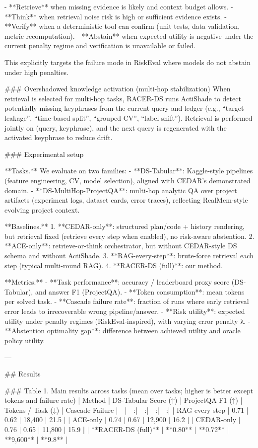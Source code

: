 - **Retrieve** when missing evidence is likely and context budget allows.
- **Think** when retrieval noise risk is high or sufficient evidence exists.
- **Verify** when a deterministic tool can confirm (unit tests, data validation, metric recomputation).
- **Abstain** when expected utility is negative under the current penalty regime and verification is unavailable or failed.

This explicitly targets the failure mode in RiskEval where models do not abstain under high penalties.

### Overshadowed knowledge activation (multi-hop stabilization)  
When retrieval is selected for multi-hop tasks, RACER-DS runs ActiShade to detect potentially missing keyphrases from the current query and ledger (e.g., “target leakage”, “time-based split”, “grouped CV”, “label shift”). Retrieval is performed jointly on (query, keyphrase), and the next query is regenerated with the activated keyphrase to reduce drift.

### Experimental setup  

**Tasks.** We evaluate on two families:
- **DS-Tabular**: Kaggle-style pipelines (feature engineering, CV, model selection), aligned with CEDAR’s demonstrated domain.
- **DS-MultiHop-ProjectQA**: multi-hop analytic QA over project artifacts (experiment logs, dataset cards, error traces), reflecting RealMem-style evolving project context.

**Baselines.**
1. **CEDAR-only**: structured plan/code + history rendering, but retrieval fixed (retrieve every step when enabled), no risk-aware abstention.
2. **ACE-only**: retrieve-or-think orchestrator, but without CEDAR-style DS schema and without ActiShade.
3. **RAG-every-step**: brute-force retrieval each step (typical multi-round RAG).
4. **RACER-DS (full)**: our method.

**Metrics.**
- **Task performance**: accuracy / leaderboard proxy score (DS-Tabular), and answer F1 (ProjectQA).
- **Token consumption**: mean tokens per solved task.
- **Cascade failure rate**: fraction of runs where early retrieval error leads to irrecoverable wrong pipeline/answer.
- **Risk utility**: expected utility under penalty regimes (RiskEval-inspired), with varying error penalty λ.
- **Abstention optimality gap**: difference between achieved utility and oracle policy utility.

---

## Results  

### Table 1. Main results across tasks (mean over tasks; higher is better except tokens and failure rate)  
| Method | DS-Tabular Score (↑) | ProjectQA F1 (↑) | Tokens / Task (↓) | Cascade Failure %
|---|---:|---:|---:|---:|
| RAG-every-step | 0.71 | 0.62 | 18,400 | 21.5 |
| ACE-only | 0.74 | 0.67 | 12,900 | 16.2 |
| CEDAR-only | 0.76 | 0.65 | 11,800 | 15.9 |
| **RACER-DS (full)** | **0.80** | **0.72** | **9,600** | **9.8** |

